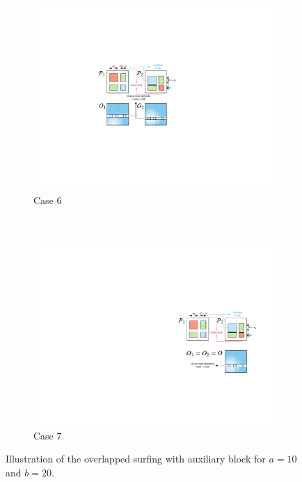 \documentclass[conference]{IEEEtran}
\begin{document}
	
	\begin{figure}
		\centering
		\begin{subfigure}[b]{0.22\textwidth}
			\includegraphics[width=\textwidth]{./img/case6-2}
			\caption{Case 6}
			\label{fig:case6}
		\end{subfigure}
		~ %
		\begin{subfigure}[b]{0.22\textwidth}
			\includegraphics[width=\textwidth]{./img/case7-2}
			\caption{Case 7}
			\label{fig:case7}
		\end{subfigure}
		\caption{Illustration of the overlapped surfing with auxiliary block for $a = 10$ and $b = 20$.}\label{fig:osurfau}
	\end{figure}
	
\end{document}
